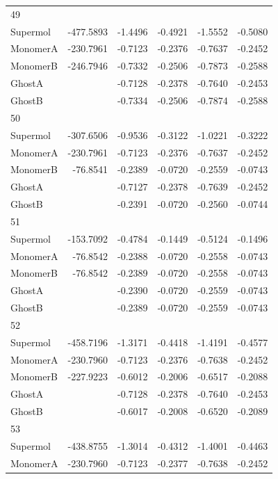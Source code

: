 \documentclass[journal=jctcce,manuscript=article]{achemso}
\begin{document}
\begin{spacing}{1}
\begin{longtable}{lRRRRR}
    49 &  &  &  &  &  \\
    Supermol & -477.5893 & -1.4496 & -0.4921 & -1.5552 & -0.5080 \\
    MonomerA & -230.7961 & -0.7123 & -0.2376 & -0.7637 & -0.2452 \\
    MonomerB & -246.7946 & -0.7332 & -0.2506 & -0.7873 & -0.2588 \\
    GhostA &  & -0.7128 & -0.2378 & -0.7640 & -0.2453 \\
    GhostB &  & -0.7334 & -0.2506 & -0.7874 & -0.2588 \\
    50 &  &  &  &  &  \\
    Supermol & -307.6506 & -0.9536 & -0.3122 & -1.0221 & -0.3222 \\
    MonomerA & -230.7961 & -0.7123 & -0.2376 & -0.7637 & -0.2452 \\
    MonomerB & -76.8541 & -0.2389 & -0.0720 & -0.2559 & -0.0743 \\
    GhostA &  & -0.7127 & -0.2378 & -0.7639 & -0.2452 \\
    GhostB &  & -0.2391 & -0.0720 & -0.2560 & -0.0744 \\
    51 &  &  &  &  &  \\
    Supermol & -153.7092 & -0.4784 & -0.1449 & -0.5124 & -0.1496 \\
    MonomerA & -76.8542 & -0.2388 & -0.0720 & -0.2558 & -0.0743 \\
    MonomerB & -76.8542 & -0.2389 & -0.0720 & -0.2558 & -0.0743 \\
    GhostA &  & -0.2390 & -0.0720 & -0.2559 & -0.0743 \\
    GhostB &  & -0.2389 & -0.0720 & -0.2559 & -0.0743 \\
    52 &  &  &  &  &  \\
    Supermol & -458.7196 & -1.3171 & -0.4418 & -1.4191 & -0.4577 \\
    MonomerA & -230.7960 & -0.7123 & -0.2376 & -0.7638 & -0.2452 \\
    MonomerB & -227.9223 & -0.6012 & -0.2006 & -0.6517 & -0.2088 \\
    GhostA &  & -0.7128 & -0.2378 & -0.7640 & -0.2453 \\
    GhostB &  & -0.6017 & -0.2008 & -0.6520 & -0.2089 \\
    53 &  &  &  &  &  \\
    Supermol & -438.8755 & -1.3014 & -0.4312 & -1.4001 & -0.4463 \\
    MonomerA & -230.7960 & -0.7123 & -0.2377 & -0.7638 & -0.2452 \\

\end{longtable}
\end{spacing}
\end{document}
